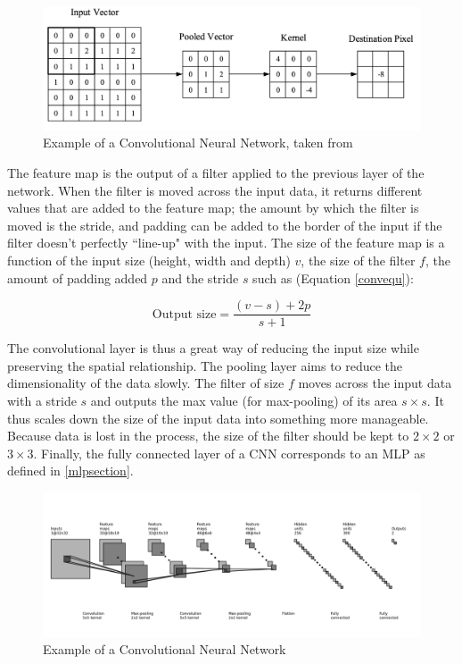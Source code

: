 \begin{figure}[H]
\centering
\includegraphics[scale=0.3]{Figures/conv2D.png}
\caption{Example of a Convolutional Neural Network, taken from \cite{cnnintro}}
\label{conv2D}
\end{figure}


The feature map is the output of a filter applied to the previous layer of the network. When the filter is moved across the input data, it returns different values that are added to the feature map; the amount by which the filter is moved is the stride, and padding can be added to the border of the input if the filter doesn't perfectly ``line-up" with the input. The size of the feature map is a function of the input size (height, width and depth) $v$, the size of the filter $f$, the amount of padding added $p$ and the stride $s$ such as (Equation \ref{convequ}):

\begin{equation}
\label{convequ}
	\text{Output size} = \frac{(v-s)+2p}{s+1}
\end{equation}

The convolutional layer is thus a great way of reducing the input size while preserving the spatial relationship. \newline
The pooling layer aims to reduce the dimensionality of the data slowly. The filter of size $f$ moves across the input data with a stride $s$ and outputs the max value (for max-pooling) of its area $s \times s$. It thus scales down the size of the input data into something more manageable. Because data is lost in the process, the size of the filter should be kept to $2 \times 2$ or $3 \times 3$.\newline
Finally, the fully connected layer of a CNN corresponds to an MLP as defined in \ref{mlpsection}.

\begin{figure}[H]
\centering
\includegraphics[scale=0.184]{Figures/cnn.png}
\caption{Example of a Convolutional Neural Network}
\label{cnnex}
\end{figure}

